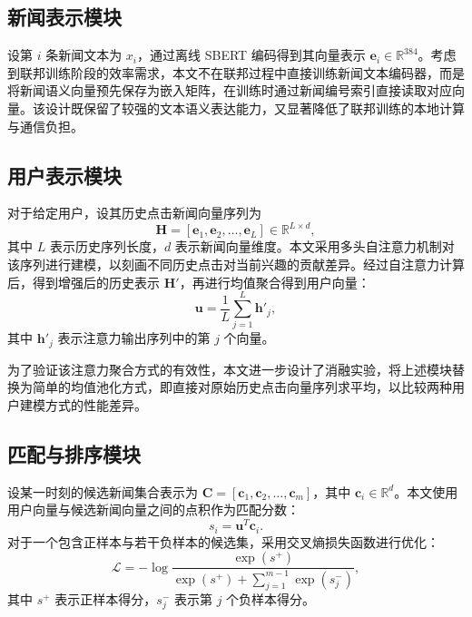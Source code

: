 \documentclass[UTF8,a4paper,12pt]{ctexart}
\numberwithin{equation}{section}
\begin{document}
\subsection{新闻表示模块}
设第 $i$ 条新闻文本为 $x_i$，通过离线 SBERT 编码得到其向量表示 $\mathbf{e}_i \in \mathbb{R}^{384}$。考虑到联邦训练阶段的效率需求，本文不在联邦过程中直接训练新闻文本编码器，而是将新闻语义向量预先保存为嵌入矩阵，在训练时通过新闻编号索引直接读取对应向量。该设计既保留了较强的文本语义表达能力，又显著降低了联邦训练的本地计算与通信负担。

\subsection{用户表示模块}
对于给定用户，设其历史点击新闻向量序列为
\begin{equation}
\mathbf{H}=[\mathbf{e}_{1},\mathbf{e}_{2},\ldots,\mathbf{e}_{L}] \in \mathbb{R}^{L \times d},
\end{equation}
其中 $L$ 表示历史序列长度，$d$ 表示新闻向量维度。本文采用多头自注意力机制对该序列进行建模，以刻画不同历史点击对当前兴趣的贡献差异。经过自注意力计算后，得到增强后的历史表示 $\mathbf{H}'$，再进行均值聚合得到用户向量：
\begin{equation}
\mathbf{u}=\frac{1}{L}\sum_{j=1}^{L}\mathbf{h}'_j,
\end{equation}
其中 $\mathbf{h}'_j$ 表示注意力输出序列中的第 $j$ 个向量。

为了验证该注意力聚合方式的有效性，本文进一步设计了消融实验，将上述模块替换为简单的均值池化方式，即直接对原始历史点击向量序列求平均，以比较两种用户建模方式的性能差异。

\subsection{匹配与排序模块}
设某一时刻的候选新闻集合表示为 $\mathbf{C}=[\mathbf{c}_1,\mathbf{c}_2,\ldots,\mathbf{c}_m]$，其中 $\mathbf{c}_i \in \mathbb{R}^{d}$。本文使用用户向量与候选新闻向量之间的点积作为匹配分数：
\begin{equation}
s_i=\mathbf{u}^{T}\mathbf{c}_i.
\end{equation}
对于一个包含正样本与若干负样本的候选集，采用交叉熵损失函数进行优化：
\begin{equation}
\mathcal{L}=-\log \frac{\exp(s^{+})}{\exp(s^{+})+\sum_{j=1}^{m-1}\exp(s_j^{-})},
\end{equation}
其中 $s^{+}$ 表示正样本得分，$s_j^{-}$ 表示第 $j$ 个负样本得分。
\end{document}
